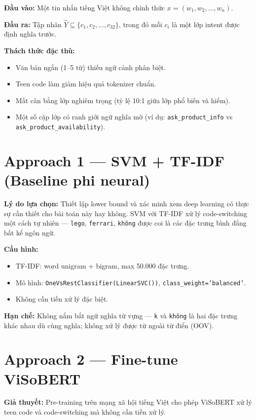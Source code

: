 \documentclass[12pt, a4paper]{report}
\begin{document}
\textbf{Đầu vào:} Một tin nhắn tiếng Việt không chính thức
$x = (w_1, w_2, \ldots, w_n)$.

\textbf{Đầu ra:} Tập nhãn $\hat{Y} \subseteq \{c_1, c_2, \ldots, c_{32}\}$,
trong đó mỗi $c_i$ là một lớp intent được định nghĩa trước.

\textbf{Thách thức đặc thù:}
\begin{itemize}
  \item Văn bản ngắn (1--5 từ) thiếu ngữ cảnh phân biệt.
  \item Teen code làm giảm hiệu quả tokenizer chuẩn.
  \item Mất cân bằng lớp nghiêm trọng (tỷ lệ 10:1 giữa lớp phổ biến và hiếm).
  \item Một số cặp lớp có ranh giới ngữ nghĩa mờ
        (ví dụ: \texttt{ask\_product\_info} vs \texttt{ask\_product\_availability}).
\end{itemize}

\section{Approach 1 — SVM + TF-IDF (Baseline phi neural)}

\textbf{Lý do lựa chọn:} Thiết lập lower bound và xác minh xem
deep learning có thực sự cần thiết cho bài toán này hay không.
SVM với TF-IDF xử lý code-switching một cách tự nhiên —
\texttt{lego}, \texttt{ferrari}, \texttt{không} được coi là
các đặc trưng bình đẳng bất kể ngôn ngữ.

\textbf{Cấu hình:}
\begin{itemize}
  \item TF-IDF: word unigram + bigram, max 50.000 đặc trưng.
  \item Mô hình: \texttt{OneVsRestClassifier(LinearSVC())},
        \texttt{class\_weight='balanced'}.
  \item Không cần tiền xử lý đặc biệt.
\end{itemize}

\textbf{Hạn chế:} Không nắm bắt ngữ nghĩa từ vựng —
\texttt{k} và \texttt{không} là hai đặc trưng khác nhau
dù cùng nghĩa; không xử lý được từ ngoài từ điển (OOV).

\section{Approach 2 — Fine-tune ViSoBERT}

\textbf{Giả thuyết:} Pre-training trên mạng xã hội tiếng Việt
cho phép ViSoBERT xử lý teen code và code-switching
mà không cần tiền xử lý.
\end{document}
